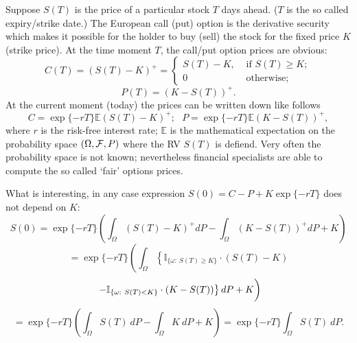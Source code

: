\documentclass[a4paper,10pt]{article}
\def\II{\mathbb{I}}
\def\EE{\mathbb{E}}
\newcommand{\1}[1]{\mathbf{1}_{\{#1\}}}
\begin{document}
Suppose $S(T)$ is the price of a particular stock $T$ days ahead. ($T$ is the so called expiry/strike date.) The European call (put) option is the derivative security which makes it possible for the holder to buy (sell) the stock for the fixed price $K$ (strike price). At the time moment $T$, the call/put option prices are obvious:
  $$C(T)=(S(T)-K)^+=\left\{\begin{array}{rl}
S(T)-K, & \mbox{ if } S(T)\ge K; \\ 0 & \mbox{ otherwise}; \end{array}\right. $$
  $$P(T)=(K-S(T))^+.$$
At the current moment (today) the prices can be written down like follows
  $$C=\exp\{-rT\}\EE(S(T)-K)^+;~~~P=\exp\{-rT\}\EE(K-S(T))^+,$$
where $r$ is the risk-free interest rate; $\EE$ is the mathematical expectation on the probability space $(\Omega,{\cal F},P)$ where the RV $S(T)$ is defiend. Very often the probability space is not known; nevertheless financial specialists are able to compute the so called `fair' options prices.

What is interesting, in any case expression $S(0)=C-P+K\exp\{-rT\}$ does not depend on $K$:
  $$S(0)=\exp\{-rT\} \left(\int_\Omega (S(T)-K)^+ dP-\int_\Omega (K-S(T))^+ dP+K\right)$$
  $$=\exp\{-rT\}\left(\int_\Omega \left\{\II_{\{\omega:~S(T)\ge K\}}\cdot(S(T)-K)\right.\right.$$
  $$\left.\vphantom{\int_\Omega}\left.-\II_{\{\omega:~S(T)<K\}}\cdot(K-S(T))\right\} dP+K\right)$$
  $$=\exp\{-rT\} \left(\int_\Omega S(T)~dP-\int_\Omega K~dP+K\right)=\exp\{-rT\} \int_\Omega S(T)~dP.$$
\end{document}
